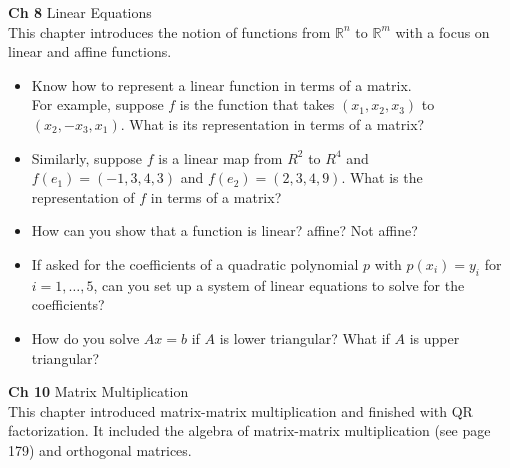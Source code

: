 \documentclass[11pt,fleqn]{article}
\begin{document}
\noindent\textbf{Ch 8} Linear Equations\\

This chapter introduces the notion of functions from $\mathbb{R}^n$ to $\mathbb{R}^m$ with a focus on linear and affine functions. \\

\begin{itemize}
\item Know how to represent a linear function in terms of a matrix.\\  
For example, suppose $f$ is the function that takes $(x_1, x_2, x_3)$ to $(x_2,-x_3, x_1)$.
What is its representation in terms of a matrix?  
\item Similarly, suppose 
$f$ is a linear map from $R^2$ to $R^4$ and $f(e_1) = (-1, 3, 4, 3)$ and $f(e_2) = (2 , 3, 4, 9)$.
What is the representation of $f$ in terms of a matrix?
\item How can you show that a function is linear? affine? Not affine?
\item If asked for the coefficients of a quadratic polynomial $p$ with $p(x_i)=y_i$ for $i=1,\ldots, 5$,
can you set up a system of linear equations to solve for the coefficients?
\item How do you solve $Ax=b$ if $A$ is lower triangular?  What if $A$ is upper triangular?
\end{itemize}

\noindent\textbf{Ch 10} Matrix Multiplication\\

This chapter introduced matrix-matrix multiplication and finished with QR factorization. It included the algebra of matrix-matrix multiplication (see page 179) and orthogonal matrices.
\end{document}
